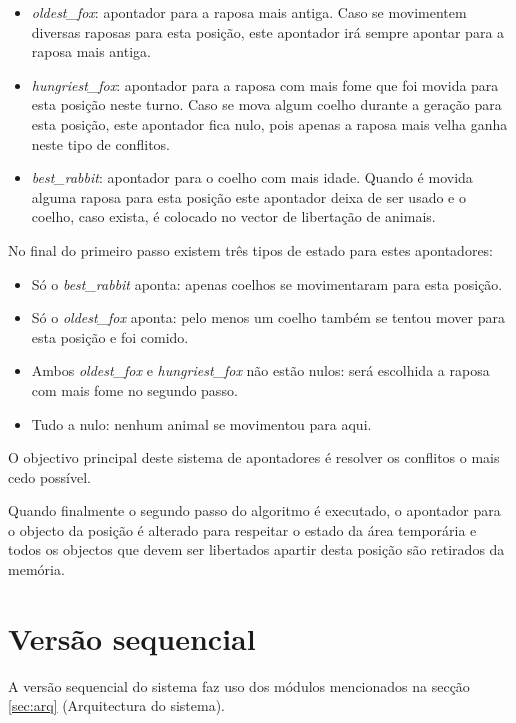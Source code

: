 \documentclass[12pt]{article}
\begin{document}
\begin{itemize}
  \item \textit{oldest\_fox}: apontador para a raposa mais antiga. Caso se movimentem diversas raposas para esta
    posição, este apontador irá sempre apontar para a raposa mais antiga.
  \item \textit{hungriest\_fox}: apontador para a raposa com mais fome que foi movida para esta posição neste turno.
  Caso se mova algum coelho durante a geração para esta posição, este apontador fica nulo, pois apenas a raposa mais
  velha ganha neste tipo de conflitos.
  \item \textit{best\_rabbit}: apontador para o coelho com mais idade. Quando é movida alguma raposa para
  esta posição este apontador deixa de ser usado e o coelho, caso exista, é colocado no vector de libertação de animais.
\end{itemize}

No final do primeiro passo existem três tipos de estado para estes apontadores:

\begin{itemize}
  \item Só o \textit{best\_rabbit} aponta: apenas coelhos se movimentaram para esta posição.
  \item Só o \textit{oldest\_fox} aponta: pelo menos um coelho também se tentou mover para esta posição e foi comido.
  \item Ambos \textit{oldest\_fox} e \textit{hungriest\_fox} não estão nulos: será escolhida a raposa com mais fome no segundo passo.
  \item Tudo a nulo: nenhum animal se movimentou para aqui.
\end{itemize}

O objectivo principal deste sistema de apontadores é resolver os conflitos o mais cedo possível.

Quando finalmente o segundo passo do algoritmo é executado, o apontador para o objecto da posição é alterado
para respeitar o estado da área temporária e todos os objectos que devem ser libertados apartir desta posição são retirados da memória.

\section{Versão sequencial}

A versão sequencial do sistema faz uso dos módulos mencionados na secção \ref{sec:arq} (Arquitectura do sistema).
\end{document}
